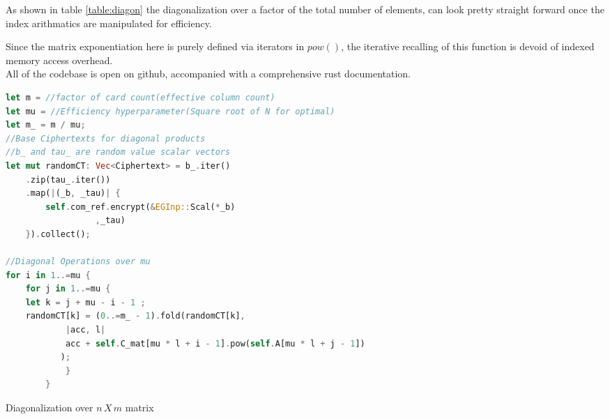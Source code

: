 \documentclass[12pt,a4paper]{report}
\begin{document}
As shown in table \ref{table:diagon} the diagonalization over a factor of the total number of elements,
can look pretty straight forward once the index arithmatics are manipulated for efficiency.

Since the matrix exponentiation here is purely defined via iterators in $pow()$, 
the iterative recalling of this function is devoid of indexed memory access overhead.\\

All of the codebase is open on github\cite{repo}, accompanied with a comprehensive rust documentation.

\begin{table}
\begin{lstlisting}[language=Rust]
let m = //factor of card count(effective column count)
let mu = //Efficiency hyperparameter(Square root of N for optimal)
let m_ = m / mu;
//Base Ciphertexts for diagonal products
//b_ and tau_ are random value scalar vectors
let mut randomCT: Vec<Ciphertext> = b_.iter()
	.zip(tau_.iter())
	.map(|(_b, _tau)| {
	    self.com_ref.encrypt(&EGInp::Scal(*_b) 
				  ,_tau)
	}).collect();

//Diagonal Operations over mu
for i in 1..=mu {
    for j in 1..=mu {
	let k = j + mu - i - 1 ;
	randomCT[k] = (0..=m_ - 1).fold(randomCT[k],
		    |acc, l|
			acc + self.C_mat[mu * l + i - 1].pow(self.A[mu * l + j - 1])
		   );
            }
        }
\end{lstlisting}
\caption{Diagonalization over $n\,X\,m$ matrix}
\label{table:diagon}
\end{table}
\end{document}
